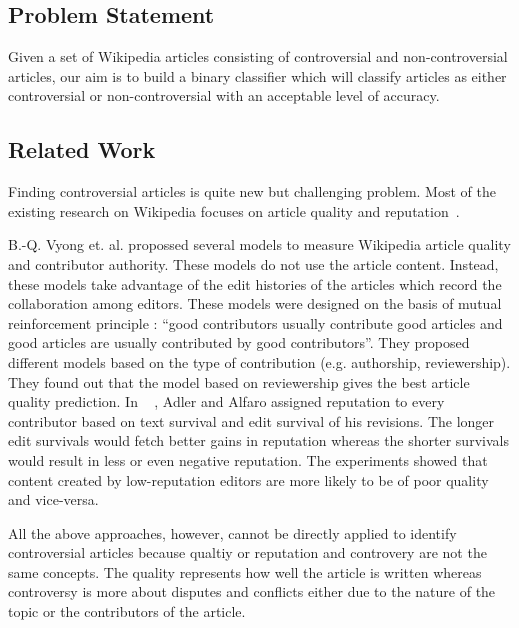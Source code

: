 \documentclass[twocolumn]{article}
\begin{document}
 \subsection{Problem Statement}

 Given a set of Wikipedia articles consisting of controversial and
non-controversial articles, our aim is to build a binary classifier
which will classify articles as either controversial or
non-controversial with an acceptable level of accuracy.

 \subsection{Related Work}

   Finding controversial articles is quite new but challenging
problem. Most of the existing research on Wikipedia focuses on article
quality and
reputation~\cite{AdlAlf2007,anthony2005eqi,conf/cikm/HuLSLV07,conf/webi/LimVLS06,conf/pst/ZengADFM06}.

   B.-Q. Vyong et. al. propossed several models to measure Wikipedia
article quality and contributor authority. These models do not use the
article content. Instead, these models take advantage of the edit
histories of the articles which record the collaboration among
editors. These models were designed on the basis of mutual
reinforcement principle : ``good contributors usually contribute good
articles and good articles are usually contributed by good
contributors''. They proposed different models based on the type of
contribution (e.g. authorship, reviewership). They found out that the
model based on reviewership gives the best article quality prediction.
In ~\cite{AdlAlf2007} , Adler and Alfaro assigned reputation to every
contributor based on text survival and edit survival of his revisions.
The longer edit survivals would fetch better gains in reputation
whereas the shorter survivals would result in less or even negative
reputation. The experiments showed that content created by
low-reputation editors are more likely to be of poor quality and
vice-versa.

   All the above approaches, however, cannot be directly applied to
identify controversial articles because qualtiy or reputation and
controvery are not the same concepts. The quality represents how well
the article is written whereas controversy is more about disputes and
conflicts either due to the nature of the topic or the contributors of
the article.
\end{document}

